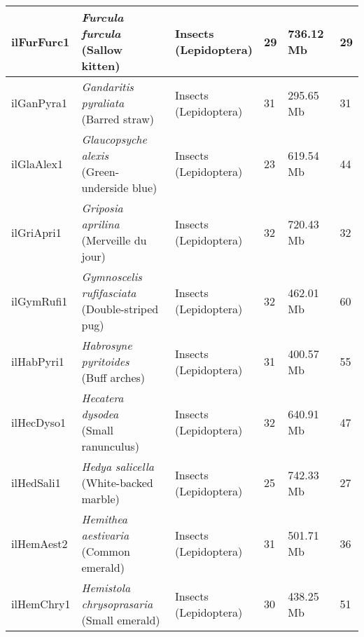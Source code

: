 \begin{centering}
\begin{longtable}{l|l|l|l|l|l}
ilFurFurc1 & \makecell[{l}]{\textit{Furcula furcula} \\ (Sallow kitten)} & \makecell[{l}]{Insects \\ (Lepidoptera)} & 29 & 736.12 Mb & 29  \\ \hline
ilGanPyra1 & \makecell[{l}]{\textit{Gandaritis pyraliata} \\ (Barred straw)} & \makecell[{l}]{Insects \\ (Lepidoptera)} & 31 & 295.65 Mb & 31  \\ \hline
ilGlaAlex1 & \makecell[{l}]{\textit{Glaucopsyche alexis} \\ (Green-underside blue)} & \makecell[{l}]{Insects \\ (Lepidoptera)} & 23 & 619.54 Mb & 44  \\ \hline
ilGriApri1 & \makecell[{l}]{\textit{Griposia aprilina} \\ (Merveille du jour)} & \makecell[{l}]{Insects \\ (Lepidoptera)} & 32 & 720.43 Mb & 32  \\ \hline
ilGymRufi1 & \makecell[{l}]{\textit{Gymnoscelis rufifasciata} \\ (Double-striped pug)} & \makecell[{l}]{Insects \\ (Lepidoptera)} & 32 & 462.01 Mb & 60  \\ \hline
ilHabPyri1 & \makecell[{l}]{\textit{Habrosyne pyritoides} \\ (Buff arches)} & \makecell[{l}]{Insects \\ (Lepidoptera)} & 31 & 400.57 Mb & 55  \\ \hline
ilHecDyso1 & \makecell[{l}]{\textit{Hecatera dysodea} \\ (Small ranunculus)} & \makecell[{l}]{Insects \\ (Lepidoptera)} & 32 & 640.91 Mb & 47  \\ \hline
ilHedSali1 & \makecell[{l}]{\textit{Hedya salicella} \\ (White-backed marble)} & \makecell[{l}]{Insects \\ (Lepidoptera)} & 25 & 742.33 Mb & 27  \\ \hline
ilHemAest2 & \makecell[{l}]{\textit{Hemithea aestivaria} \\ (Common emerald)} & \makecell[{l}]{Insects \\ (Lepidoptera)} & 31 & 501.71 Mb & 36  \\ \hline
ilHemChry1 & \makecell[{l}]{\textit{Hemistola chrysoprasaria} \\ (Small emerald)} & \makecell[{l}]{Insects \\ (Lepidoptera)} & 30 & 438.25 Mb & 51  \\ \hline

\end{longtable}
\end{centering}
